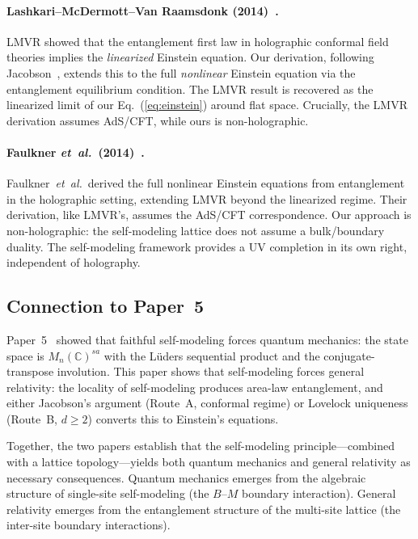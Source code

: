 \paragraph{Lashkari--McDermott--Van Raamsdonk (2014)~\cite{LMVR2014}.}
LMVR showed that the entanglement first law in holographic conformal field
theories implies the \emph{linearized} Einstein equation.  Our
derivation, following Jacobson~\cite{Jacobson2016}, extends this to the
full \emph{nonlinear} Einstein equation via the entanglement equilibrium
condition.  The LMVR result is recovered as the linearized limit of our
Eq.~(\ref{eq:einstein}) around flat space.  Crucially, the LMVR derivation
assumes AdS/CFT, while ours is non-holographic.

\paragraph{Faulkner \textit{et~al.}\ (2014)~\cite{Faulkner2014}.}
Faulkner~\textit{et~al.}\ derived the full nonlinear Einstein equations
from entanglement in the holographic setting, extending LMVR beyond the
linearized regime.  Their derivation, like LMVR's, assumes the AdS/CFT
correspondence.  Our approach is non-holographic: the self-modeling
lattice does not assume a bulk/boundary duality.  The self-modeling
framework provides a UV completion in its own right, independent of
holography.

\subsection{Connection to Paper~5}
\label{sec:paper5-connection}

Paper~5~\cite{Paper5} showed that faithful self-modeling forces quantum
mechanics: the state space is $M_n(\mathbb{C})^{sa}$ with the L\"uders
sequential product and the conjugate-transpose involution.  This paper
shows that self-modeling forces general relativity: the locality of
self-modeling produces area-law entanglement, and either Jacobson's
argument (Route~A, conformal regime) or Lovelock uniqueness (Route~B,
$d \geq 2$) converts this to Einstein's equations.

Together, the two papers establish that the self-modeling
principle---combined with a lattice topology---yields both quantum
mechanics and general relativity as necessary consequences.  Quantum
mechanics emerges from the algebraic structure of single-site
self-modeling (the $B$--$M$ boundary interaction).  General relativity
emerges from the entanglement structure of the multi-site lattice (the
inter-site boundary interactions).

